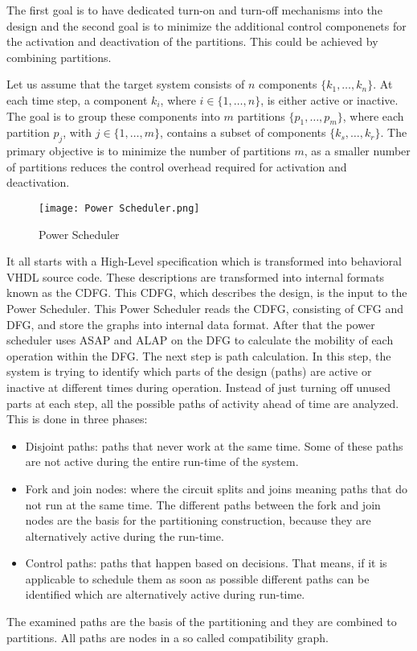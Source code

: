 \documentclass[conference]{IEEEtran}
\begin{document}
The first goal is to have dedicated turn-on and turn-off mechanisms into the design and the second goal is to minimize the additional control componenets for the activation and deactivation of the partitions. This could be achieved by combining partitions. 

Let us assume that the target system consists of $n$ components $\{k_1, \ldots, k_n\}$. At each time step, a component $k_i$, where $i \in \{1, \ldots, n\}$, is either active or inactive. The goal is to group these components into $m$ partitions $\{p_1, \ldots, p_m\}$, where each partition $p_j$, with $j \in \{1, \ldots, m\}$, contains a subset of components $\{k_s, \ldots, k_r\}$. The primary objective is to minimize the number of partitions $m$, as a smaller number of partitions reduces the control overhead required for activation and deactivation.

\begin{figure}
    \centering
    \texttt{[image: Power Scheduler.png]}
    \caption{Power Scheduler \cite{Ret}}
    \label{fig:power scheduler}
\end{figure}

It all starts with a High-Level specification which is transformed into behavioral VHDL source code. These descriptions are transformed into internal formats known as the CDFG. This CDFG, which describes the design, is the input to the Power Scheduler. This Power Scheduler reads the CDFG, consisting of CFG and DFG, and store the graphs into internal data format. After that the power scheduler uses ASAP and ALAP on the DFG to calculate the mobility of each operation within the DFG. The next step is path calculation. In this step, the system is trying to identify which parts of the design (paths) are active or inactive at different times during operation. Instead of just turning off unused parts at each step, all the possible paths of activity ahead of time are analyzed. This is done in three phases:
\begin{itemize}
    \item Disjoint paths: paths that never work at the same time. Some of these paths are not active during the entire run-time of the system.
    \item Fork and join nodes: where the circuit splits and joins meaning paths that do not run at the same time. The different paths between the fork and join nodes are the basis for the partitioning construction, because they are alternatively active during the run-time.
    \item Control paths: paths that happen based on decisions. That means, if it is applicable to schedule them as soon as possible different paths can be identified which are alternatively active during run-time.
\end{itemize}
The examined paths are the basis of the partitioning and they are combined to partitions. All paths are nodes in a so called compatibility graph. 
\end{document}
